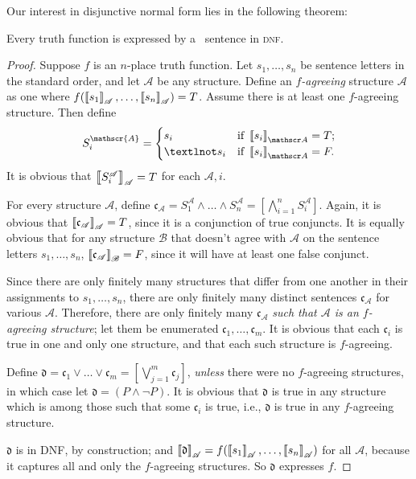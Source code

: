 Our interest in disjunctive normal form lies in the following theorem: 
\begin{theorem}\label{dnf}
	Every truth function is expressed by a \lone\ sentence in \textsc{\lowercase{DNF}}.
\begin{proof}	
Suppose $f$ is an $n$-place truth function. Let $s_{1},\ldots,s_{n}$ be  sentence letters in the standard order, and let $\mathscr{A}$ be any structure.  Define an \emph{$f$-agreeing} structure $\mathscr{A}$ as one where $f(\left\llbracket s_{1}\right\rrbracket_{\mathscr{A}},\ldots,\left\llbracket s_{n}\right\rrbracket_{\mathscr{A}}) = T$. Assume there is at least one $f$-agreeing structure. Then define $$S^{\mathscr{A}}_{i} = \begin{cases}
	s_{i} &\text{if } \val{s_{i}}{A} = T;\\
	¬s_{i} &\text{if } \val{s_{i}}{A} = F.
\end{cases}$$ 
 It is obvious that $\left\llbracket S_{i}^{\mathscr{A}}\right\rrbracket_{\mathscr{A}} = T$ for each $\mathscr{A}, i$.

For every structure $\mathscr{A}$, define $\mathfrak{c}_{\mathscr{A}} = S^{\mathscr{A}}_{1}\wedge\ldots\wedge S^{\mathscr{A}}_{n} = \left[\bigwedge_{i=1}^{n}S^{\mathscr{A}}_{i}\right]$. Again, it is obvious that $\left\llbracket \mathfrak{c}_{\mathscr{A}}\right\rrbracket_{\mathscr{A}}=T$, since it is a conjunction of true conjuncts. It is equally obvious that for any structure $\mathscr{B}$ that doesn't agree with $\mathscr{A}$ on the sentence letters $s_{1},…,s_{n}$, $\left\llbracket \mathfrak{c}_{\mathscr{A}}\right\rrbracket_{\mathscr{B}}=F$, since it will have at least one false conjunct.

 Since there are only finitely many structures that differ from one another in their assignments to $s_{1},\ldots,s_{n}$, there are only finitely many distinct sentences $\mathfrak{c}_{\mathscr{A}}$ for various $\mathscr{A}$.  Therefore, there are only finitely many $\mathfrak{c}_{\mathscr{A}}$ \emph{such that $\mathscr{A}$ is an $f$-agreeing structure}; let them be enumerated $\mathfrak{c}_{1},\ldots,\mathfrak{c}_{m}.$ It is obvious that each $\mathfrak{c}_{i}$ is true in one and only one structure, and that each such structure is $f$-agreeing.

 Define $\mathfrak{d} = \mathfrak{c}_{1} \vee \ldots \vee \mathfrak{c}_{m} = \left[\bigvee_{j=1}^{m} \mathfrak{c}_{j}\right]$,  \emph{unless} there were no $f$-agreeing structures, in which case let $\mathfrak{d} = (P \wedge \neg P)$. It is obvious that $\mathfrak{d}$ is true in any structure which is among those such that some $\mathfrak{c}_{i}$ is true, i.e., $\mathfrak{d}$ is true in any $f$-agreeing structure.

$\mathfrak{d}$ is in DNF, by construction; and $\left\llbracket \mathfrak{d}\right\rrbracket_{\mathscr{A}} = f(\left\llbracket s_{1}\right\rrbracket_{\mathscr{A}},\ldots,\left\llbracket s_{n}\right\rrbracket_{\mathscr{A}})$  for all $\mathscr{A}$, because it captures all and only the $f$-agreeing structures. So $\mathfrak{d}$ expresses $f$. \end{proof}\end{theorem}



